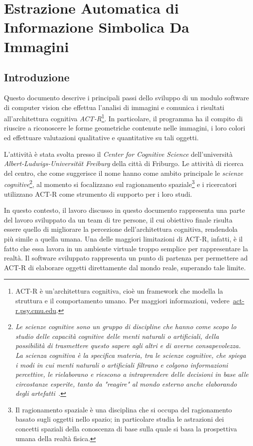 \chapter*{Estrazione Automatica di Informazione Simbolica Da Immagini}
	
	\section*{Introduzione}
	Questo documento descrive i principali passi dello sviluppo di un modulo software di computer vision che effettua l'analisi di immagini e comunica i risultati all'architettura cognitiva \mbox{\emph{ACT-R}}\footnote{ACT-R è un'architettura cognitiva, cioè un framework che modella la struttura e il comportamento umano. Per maggiori informazioni, vedere~\url{act-r.psy.cmu.edu}.}.
	In particolare, il programma ha il compito di riuscire a riconoscere le forme geometriche contenute nelle immagini, i loro colori ed effettuare valutazioni qualitative e quantitative su tali oggetti.

	L'attività è stata svolta presso il \emph{Center for Cognitive Science} dell'università \emph{Albert-Ludwigs-Universität Freiburg} della città di Friburgo.
	Le attività di ricerca del centro, che come suggerisce il nome hanno come ambito principale le \emph{scienze cognitive}\footnote{\emph{Le scienze cognitive sono un gruppo di discipline che hanno come scopo lo studio delle capacità cognitive delle menti naturali o artificiali, della possibilità di trasmettere questo sapere agli altri e di averne consapevolezza. La scienza cognitiva è la specifica materia, tra le scienze cognitive, che spiega i modi in cui menti naturali o artificiali filtrano e colgono informazioni percettive, le rielaborano e riescono a intraprendere delle decisioni in base alle circostanze esperite, tanto da "reagire" al mondo esterno anche elaborando degli artefatti}~\cite{legrenzi2005prima}.}, 	
	al momento si focalizzano sul ragionamento spaziale\footnote{Il ragionamento spaziale è una disciplina che si occupa del ragionamento basato sugli oggetti nello spazio; in particolare studia le astrazioni dei concetti spaziali della conoscenza di base sulla quale si basa la prospettiva umana della realtà fisica.} e i ricercatori utilizzano ACT-R come strumento di supporto per i loro studi. 
	
	In questo contesto, il lavoro discusso in questo documento rappresenta una parte del lavoro sviluppato da un team di tre persone, il cui obiettivo finale risulta essere quello di migliorare la percezione dell'architettura cognitiva, rendendola più simile a quella umana.  
	Una delle maggiori limitazioni di \mbox{ACT-R}, infatti, è il fatto che essa lavora in un ambiente virtuale troppo semplice per rappresentare la realtà. 
	Il software sviluppato rappresenta un punto di partenza per permettere ad \mbox{ACT-R} di elaborare oggetti direttamente dal mondo reale, superando tale limite.
	 
